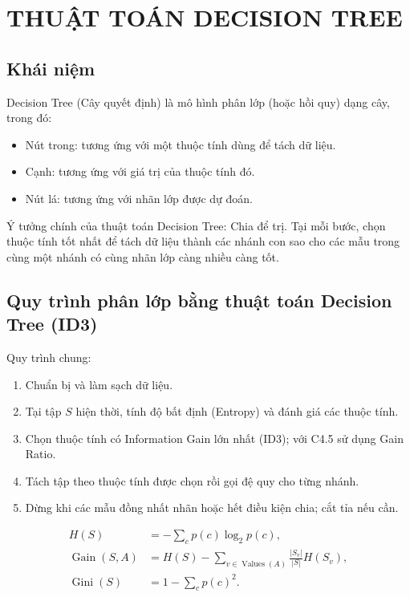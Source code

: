 \section{THUẬT TOÁN DECISION TREE}

\subsection{Khái niệm}
Decision Tree (Cây quyết định) là mô hình phân lớp (hoặc hồi quy) dạng cây, trong đó:
\begin{itemize}
    \item Nút trong: tương ứng với một thuộc tính dùng để tách dữ liệu.
    \item Cạnh: tương ứng với giá trị của thuộc tính đó.
    \item Nút lá: tương ứng với nhãn lớp được dự đoán.
\end{itemize}

Ý tưởng chính của thuật toán Decision Tree: Chia để trị. Tại mỗi bước, chọn thuộc tính tốt nhất để tách dữ liệu thành các nhánh con sao cho các mẫu trong cùng một nhánh có cùng nhãn lớp càng nhiều càng tốt.

\subsection{Quy trình phân lớp bằng thuật toán Decision Tree (ID3)}
Quy trình chung:
\begin{enumerate}[label=\textbf{Bước \arabic*:}]
  \item Chuẩn bị và làm sạch dữ liệu.
  \item Tại tập $S$ hiện thời, tính độ bất định (Entropy) và đánh giá các thuộc tính.
  \item Chọn thuộc tính có Information Gain lớn nhất (ID3); với C4.5 sử dụng Gain Ratio.
  \item Tách tập theo thuộc tính được chọn rồi gọi đệ quy cho từng nhánh.
  \item Dừng khi các mẫu đồng nhất nhãn hoặc hết điều kiện chia; cắt tỉa nếu cần.
\end{enumerate}
\begin{align}
H(S)&=-\sum_{c}p(c)\log_2p(c),\\
\operatorname{Gain}(S,A)&=H(S)-\sum_{v\in\operatorname{Values}(A)}\frac{|S_v|}{|S|}H(S_v),\\
\operatorname{Gini}(S)&=1-\sum_c p(c)^2.
\end{align}

